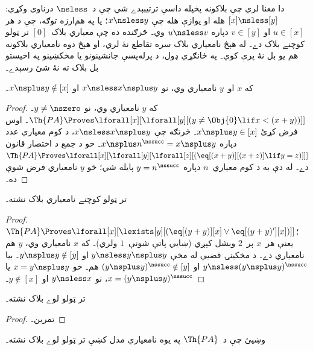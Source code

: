 \documentclass[../../../include/open-logic-section]{subfiles}
\begin{document}
\begin{explain}
دا معنا لري چې بلاکونه پخپله داسې ترتيبېدے شي چې د~$\nsless$ درناوی
وکړي: $[x]\nsless[y]$ هله او يوازې هله چې $x\nsless y$؛ يا په
هم‌ارزه توګه، چې د هر $u\in[x]$ او $v\in[y]$ دپاره
$u\nsless v$ وي۔ څرګنده ده چې معياري بلاک~$[0]$ تر ټولو کوچنے بلاک
دے۔ له هېڅ نامعياري بلاک سره تقاطع نۀ لري، او هېڅ دوه نامعياري
بلاکونه هم يو بل نۀ پرې کوي۔ په ځانګړي ډول، د پرله‌پسې جانشينونو يا
مخکښينو په اخيستو بل بلاک ته نۀ شئ رسېدے۔
\end{explain}

\begin{prop}
که $x$ او~$y$ نامعياري وي، نو $x\nsless x\nsplus y$ او
$x\nsplus y\notin[x]$۔
\end{prop}

\begin{proof}
که $y$ نامعياري وي، نو $y\neq\nszero$۔
$\Th{PA} \Proves \lforall[x][\lforall[y][(y \neq \Obj{0} \lif x < (x+y))]]$۔
اوس فرض کړئ $x\nsplus y\in[x]$۔ څرنګه چې
$x\nsless x\nsplus y$، د کوم معياري عدد دپاره
$x\nsplus n^\nssucc=x\nsplus y$۔ خو د جمع د اختصار قانون
$\Th{PA} \Proves \lforall[x][\lforall[y][\lforall[z][(\eq[(x+y)][(x+z)] \lif y = z)]]]$
دے۔ له دې به د کوم معياري~$n$ دپاره $y=n^\nssucc$ پايله شي؛ خو
$y$ نامعياري فرض شوې ده۔
\end{proof}

\begin{prop}
تر ټولو کوچنے نامعياري بلاک نشته۔
\end{prop}

\begin{proof}
$\Th{PA} \Proves \lforall[x][\lexists[y][(\eq[(y+y)][x] \lor
      \eq[(y+y)'][x])]]$؛ يعنې هر~$x$ پر~$2$ وېشل کېږي (ښايي پاتې
شونې~$1$ ولري)۔ که $x$ نامعياري وي، $y$ هم نامعياري دے۔ د مخکينۍ
قضيې له مخې $y\nsless y\nsplus y$ او $y\nsplus y\notin[y]$۔
بيا $y\nsless(y\nsplus y)^\nssucc$ او
$(y\nsplus y)^\nssucc\notin[y]$ هم۔ خو
$x=y\nsplus y$ يا $x=(y\nsplus y)^\nssucc$، نو $y\nsless x$ او
$y\notin[x]$۔
\end{proof}

\begin{prop}
تر ټولو لوے بلاک نشته۔
\end{prop}

\begin{proof}
تمرين۔
\end{proof}

\begin{prob}
وښيئ چې د~$\Th{PA}$ په يوه نامعياري مدل کښې تر ټولو لوے بلاک
نشته۔
\end{prob}
\end{document}
